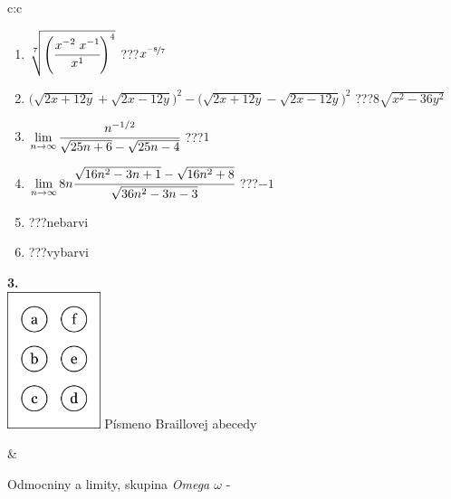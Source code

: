 \documentclass[10pt]{report}
\begin{document}
\begin{tabular}{c:c}
\begin{minipage}[c][104.5mm][t]{0.5\linewidth}
\begin{center}
\begin{minipage}{0.79\linewidth}
\begin{center}
\begin{varwidth}{\linewidth}
\begin{enumerate}
\small
\item $\sqrt[7]{\left(\cfrac{x^{-2}\;x^{-1}}{x^{1}}\right)^{4}}$\quad \dotfill\; ???\;\dotfill \quad $x^{\nicefrac{-8}{7}}$
\item {\footnotesize{\scriptsize$\big(\sqrt{2x+12y}+\sqrt{2x-12y}\big)^2-\big(\sqrt{2x+12y}-\sqrt{2x-12y}\big)^2$}\quad \dotfill\; ???\;\dotfill \quad $8\sqrt{x^2-36y^2}$}
\item $\lim\limits_{n\to\infty}\cfrac{n^{-1/2}}{\sqrt{25n+6}-\sqrt{25n-4}}$\quad \dotfill\; ???\;\dotfill \quad $1$
\item $\lim\limits_{n\to\infty}8n\cfrac{\sqrt{16n^2-3n+1}-\sqrt{16n^2+8}}{\sqrt{36n^2-3n-3}}$\quad \dotfill\; ???\;\dotfill \quad $-1$
\item \quad \dotfill\; ???\;\dotfill \quad nebarvi
\item \quad \dotfill\; ???\;\dotfill \quad vybarvi
\end{enumerate}
\end{varwidth}
\end{center}
\end{minipage}
\begin{minipage}{0.20\linewidth}
\begin{center}
{\Huge\bfseries 3.} \\[2mm]
\includegraphics[height=40mm]{../images/braille.png}
{\small Písmeno Braillovej abecedy}
\end{center}
\end{minipage}
\end{center}
\end{minipage}
&
\begin{minipage}[c][104.5mm][t]{0.5\linewidth}
\begin{center}
\vspace{7mm}
{\huge Odmocniny a limity, skupina \textit{Omega $\omega$} -}\\[5mm]

\end{center}
\end{minipage}
\end{tabular}
\end{document}
